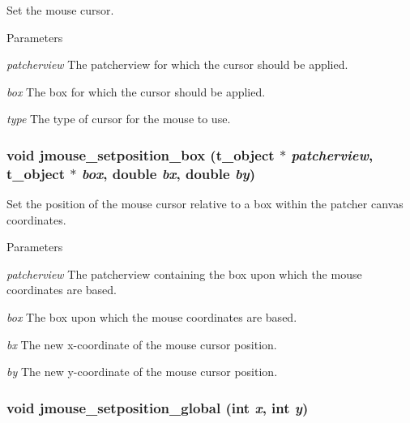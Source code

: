 Set the mouse cursor. 
\begin{DoxyParams}{Parameters}
\item[{\em patcherview}]The patcherview for which the cursor should be applied. \item[{\em box}]The box for which the cursor should be applied. \item[{\em type}]The type of cursor for the mouse to use. \end{DoxyParams}
\hypertarget{group__jmouse_ga8d209aa8fadfbe4d5038b2041eae801e}{
\subsubsection[{jmouse\_\-setposition\_\-box}]{\setlength{\rightskip}{0pt plus 5cm}void jmouse\_\-setposition\_\-box ({\bf t\_\-object} $\ast$ {\em patcherview}, \/  {\bf t\_\-object} $\ast$ {\em box}, \/  double {\em bx}, \/  double {\em by})}}
\label{group__jmouse_ga8d209aa8fadfbe4d5038b2041eae801e}


Set the position of the mouse cursor relative to a box within the patcher canvas coordinates. 
\begin{DoxyParams}{Parameters}
\item[{\em patcherview}]The patcherview containing the box upon which the mouse coordinates are based. \item[{\em box}]The box upon which the mouse coordinates are based. \item[{\em bx}]The new x-\/coordinate of the mouse cursor position. \item[{\em by}]The new y-\/coordinate of the mouse cursor position. \end{DoxyParams}
\hypertarget{group__jmouse_ga0e92a3887f089a7cc52d142b4e99daac}{
\subsubsection[{jmouse\_\-setposition\_\-global}]{\setlength{\rightskip}{0pt plus 5cm}void jmouse\_\-setposition\_\-global (int {\em x}, \/  int {\em y})}}
\label{group__jmouse_ga0e92a3887f089a7cc52d142b4e99daac}


